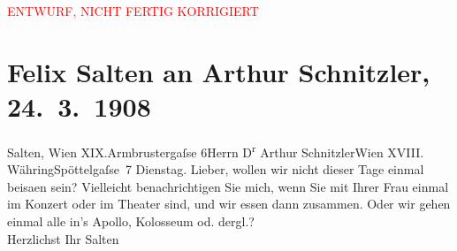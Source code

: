 
\begin{center}
            \textcolor{red}{ENTWURF, NICHT FERTIG KORRIGIERT}
                      \end{center}
            
         
         \renewcommand{\erwaehntePersonen}{Personen: Olga Schnitzler}
         \renewcommand{\erwaehnteOrte}{Orte: Apollo-Theater, Armbrustergasse, Colosseum, Edmund-Weiß-Gasse, I., Innere Stadt, Wien, XIX., Döbling, XVIII., Währing}
         \renewcommand{\erwaehnteWerke}{}
               \section[Felix Salten an Arthur Schnitzler, 24. 3. 1908]{ Felix Salten an Arthur Schnitzler, 24. 3. 1908}\nopagebreak{}\rehead{ }\begin{ledgroupsized}[t]{13cm}\normalsize\beginnumbering \toendnotes[C]{\smallbreak\pagebreak[2]} 
\toendnotes[C]{\smallbreak}\pstart{}{\pb}Salten, Wien XIX.\pend{}\pstart{}Armbrustergaſse 6\pend{}{\bigskip}\pstart{}Herrn D\textsuperscript{r} Arthur Schnitzler\pend{}\pstart{}Wien XVIII. Währing\pend{}\pstart{}Spöttelgaſse 7\pend{}{\bigskip}\pstart
           \raggedleft{}{\pb}Dienstag. \pend
           \pstart{}Lieber,\pend\pstart
           wollen wir nicht dieser Tage einmal beisa{\geminationm}en sein?
               Vielleicht benachrichtigen Sie mich, wenn Sie mit Ihrer Frau einmal im Konzert oder im Theater sind,
               und wir essen dann zusammen. Oder wir gehen einmal alle in’s Apollo, Kolosseum od.
               dergl.? {\\}Herzlichst\pend
           \pstart Ihr \spacefill\mbox{Salten}\pend{}
         
         \endnumbering{}\end{ledgroupsized}\begin{anhang}\end{anhang}\newcommand{\dateiname}{L03493}\newcommand{\titel}{Felix Salten an Arthur Schnitzler, 24. 3. 1908}\newcommand{\editorInnen}{Martin Anton Müller und Laura Untner}
      